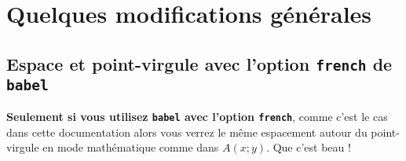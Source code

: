 \documentclass[12pt,a4paper]{article}
\begin{document}
\section{Quelques modifications générales}

\subsection{Espace et point-virgule avec l'option \texttt{french} de \texttt{babel}}

\textbf{Seulement si vous utilisez \texttt{babel} avec l'option \texttt{french}}, comme c'est le cas dans cette documentation alors vous verrez le même espacement autour du point-virgule en mode mathématique comme dans $A(x;y)$. Que c'est beau !
\end{document}
